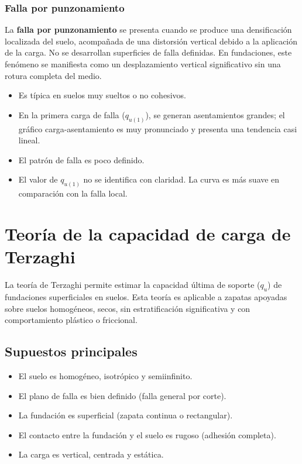 \documentclass{article} %
\begin{document}
\subsubsection*{Falla por punzonamiento}

La \textbf{falla por punzonamiento} se presenta cuando se produce una densificación localizada del suelo, acompañada de una distorsión vertical debido a la aplicación de la carga. No se desarrollan superficies de falla definidas. En fundaciones, este fenómeno se manifiesta como un desplazamiento vertical significativo sin una rotura completa del medio.

\begin{itemize}
    \item Es típica en suelos muy sueltos o no cohesivos.
    \item En la primera carga de falla ($q_{u(1)}$), se generan asentamientos grandes; el gráfico carga-asentamiento es muy pronunciado y presenta una tendencia casi lineal.
    \item El patrón de falla es poco definido.
    \item El valor de $q_{u(1)}$ no se identifica con claridad. La curva es más suave en comparación con la falla local.
\end{itemize}

\newpage


\section*{Teoría de la capacidad de carga de Terzaghi}

La teoría de Terzaghi permite estimar la capacidad última de soporte ($q_u$) de fundaciones superficiales en suelos. Esta teoría es aplicable a zapatas apoyadas sobre suelos homogéneos, secos, sin estratificación significativa y con comportamiento plástico o friccional.

\subsection*{Supuestos principales}
\begin{itemize}
    \item El suelo es homogéneo, isotrópico y semiinfinito.
    \item El plano de falla es bien definido (falla general por corte).
    \item La fundación es superficial (zapata continua o rectangular).
    \item El contacto entre la fundación y el suelo es rugoso (adhesión completa).
    \item La carga es vertical, centrada y estática.
\end{itemize}
\end{document}
